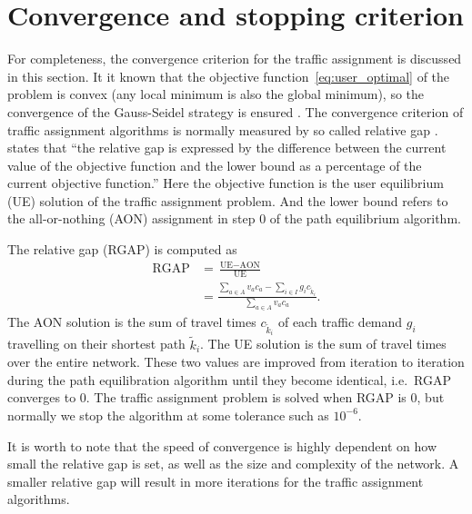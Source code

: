 \section{Convergence and stopping criterion} \label{sec:convergence}
For completeness, the convergence criterion for the traffic assignment is discussed in this section.
It it known that the objective function~\eqref{eq:user_optimal} of the problem is convex (any local minimum is also the global minimum),
so the convergence of the Gauss-Seidel strategy is ensured \citep{Florian2008}.
The convergence criterion of traffic assignment algorithms is normally measured by so called relative gap \citep{Rose}.
\cite{Rose} states that ``the relative gap is expressed by the difference between the current value of 
the objective function and the lower bound as a percentage of the current objective function.''
Here the objective function is the user equilibrium (UE) solution of the traffic assignment problem.
And the lower bound refers to the all-or-nothing (AON) assignment in step 0 of the path equilibrium algorithm.

The relative gap (RGAP) is computed as
\begin{align}
    \text{RGAP} &= \frac{\text{UE} - \text{AON}}{\text{UE}} \nonumber \\
    &= \frac{\sum_{a \in A} v_a c_a - \sum_{i \in I} g_i c_{\tilde{k}_i}}{\sum_{a \in A} v_a c_a}.
\end{align}
The AON solution is the sum of travel times $c_{\tilde{k}_i}$ of each traffic demand $g_i$ travelling on their shortest path $\tilde{k}_i$.
The UE solution is the sum of travel times over the entire network.
These two values are improved from iteration to iteration during the path equilibration algorithm until they become identical, i.e.\ RGAP converges to 0.
The traffic assignment problem is solved when RGAP is 0,
but normally we stop the algorithm at some tolerance such as $10^{-6}$.

It is worth to note that the speed of convergence is highly dependent on how small the relative gap is set,
as well as the size and complexity of the network.
A smaller relative gap will result in more iterations for the traffic assignment algorithms.
